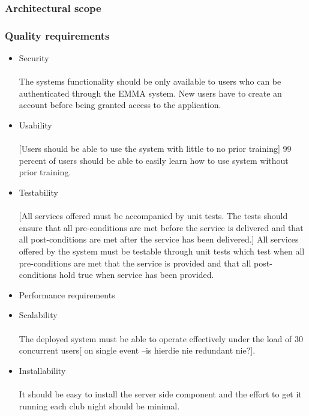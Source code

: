 \documentclass[10pt,a4paper]{article}
\begin{document}
\subsubsection{Architectural scope}
\subsubsection{Quality requirements}
\begin{itemize}
\item Security
\paragraph{}
The systems functionality should be only available to users who can be authenticated through the EMMA system. New users have to create an account before being granted access to the application.
\item Usability
\paragraph{}
[Users should be able to use the system with little to no prior training]
99 percent of users should be able to easily learn how to use system without prior training.
\item Testability
\paragraph{}
[All services offered must be accompanied by unit tests. The tests should ensure that all pre-conditions are met before the service is delivered and that all post-conditions are met after the service has been delivered.]
All services offered by the system must be testable through unit tests which test when all pre-conditions are met that the service is provided and that all post-conditions hold true when service has been provided.
\item Performance requirements
\item Scalability
\paragraph{}
The deployed system must be able to operate effectively under the load of 30 concurrent users[ on single event --is hierdie nie redundant nie?].
\item Installability
\paragraph{}
It should be easy to install the server side component and the effort to get it running each club night should be minimal.
\end{itemize}
\end{document}
